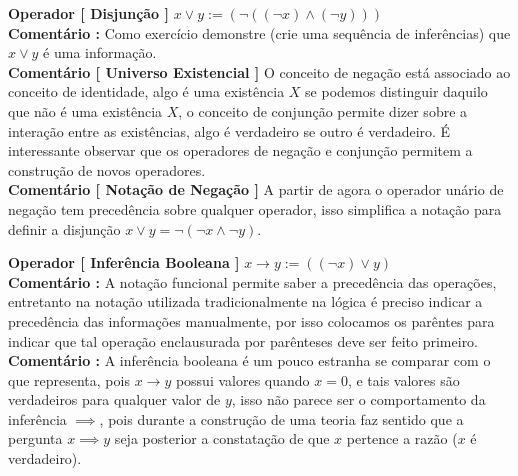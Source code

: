 \documentclass[10pt,a4paper]{report}
\begin{document}
\textbf{Operador [ Disjunção ]} $x\vee y := ( \neg ( (\neg x) \wedge (\neg y) ) )$\\


\textbf{Comentário :} Como exercício demonstre (crie uma sequência de inferências) que $x \vee y$ é uma informação.\\

\textbf{Comentário [ Universo Existencial ]} O conceito de negação está associado ao conceito de identidade, algo é uma existência $X$ se podemos distinguir daquilo que não é uma existência $X$, o conceito de conjunção permite dizer sobre a interação entre as existências, algo é verdadeiro se outro é verdadeiro. É interessante observar que os operadores de negação e conjunção permitem a construção de novos operadores.\\

\textbf{Comentário [ Notação de Negação ]} A partir de agora o operador unário de negação tem precedência sobre qualquer operador, isso simplifica a notação para definir a disjunção $x \vee y = \neg( \neg x \wedge \neg y ) $.

\hspace{\baselineskip}

\textbf{Operador [ Inferência Booleana ]} $ x \rightarrow y := ( (\neg x) \vee y ) $\\

\textbf{Comentário :} A notação funcional permite saber a precedência das operações, entretanto na notação utilizada tradicionalmente na lógica é preciso indicar a precedência das informações manualmente, por isso colocamos os parêntes para indicar que tal operação enclausurada por parênteses deve ser feito primeiro.\\

\textbf{Comentário :} A inferência booleana é um pouco estranha se comparar com o que representa, pois $x\rightarrow y$ possui valores quando $x=0$, e tais valores são verdadeiros para qualquer valor de $y$, isso não parece ser o comportamento da inferência $\implies$, pois durante a construção de uma teoria faz sentido que a pergunta $x \implies y$ seja posterior a constatação de que $x$ pertence a razão ($x$ é verdadeiro). \\
\end{document}

